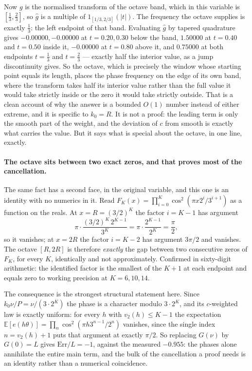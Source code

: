 \documentclass[11pt]{article}
\theoremstyle{remark}
\begin{document}
Now $g$ is the normalised transform of the octave band, which in this variable is $[\tfrac13,\tfrac23]$,
so $\hat g$ is a multiple of $1_{[1/3,2/3]}(|t|)$. The frequency the octave supplies is exactly
$\tfrac13$: the left endpoint of that band. Evaluating $\hat g$ by tapered quadrature gives
$-0.00000,-0.00000$ at $t=0.20,0.30$ below the band, $1.50000$ at $t=0.40$ and $t=0.50$ inside it,
$-0.00000$ at $t=0.80$ above it, and $0.75000$ at both endpoints $t=\tfrac13$ and $t=\tfrac23$ ---
exactly half the interior value, as a jump discontinuity gives. So the octave, which is precisely the
window whose starting point equals its length, places the phase frequency on the edge of its own band,
where the transform takes half its interior value rather than the full value it would take strictly
inside or the zero it would take strictly outside. That is a clean account of why the answer is a
bounded $O(1)$ number instead of either extreme, and it is specific to $k_0=R$. It is not a proof: the
leading term is only the smooth part of the weight, and the deviation of $c$ from smooth is exactly what
carries the value. But it says what is special about the octave, in one line, exactly.

\paragraph{The octave sits between two exact zeros, and that proves most of the cancellation.} The same
fact has a second face, in the original variable, and this one is an identity with no numerics in it.
Read $F_K(x)=\prod_{i=0}^K\cos^2(\pi x2^i/3^{i+1})$ as a function on the reals. At $x=R=(3/2)^K$ the
factor $i=K-1$ has argument
\[
  \pi\cdot\frac{(3/2)^K\,2^{K-1}}{3^K}=\pi\cdot\frac{2^{K-1}}{2^K}=\frac\pi2 ,
\]
so it vanishes; at $x=2R$ the factor $i=K-2$ has argument $3\pi/2$ and vanishes. The octave $[R,2R]$ is
therefore \emph{exactly} the gap between two consecutive zeros of $F_K$, for every $K$, identically and
not approximately. Confirmed in sixty-digit arithmetic: the identified factor is the smallest of the
$K+1$ at each endpoint and equals zero to working precision at $K=6,10,14$.

The consequence is the strongest structural statement here. Since $k_0\nu/P=\nu/(3\cdot2^K)$ the phase
is a character modulo $3\cdot2^K$, and its $c$-weighted law is exactly uniform: for every $h$ with
$v_2(h)\le K-1$ the expectation $\mathbb E[e(h\theta)]=\prod_n\cos^2(\pi h3^{n-1}/2^n)$ vanishes, since
the single index $n=v_2(h)+1$ puts that argument at exactly $\pi/2$. So replacing $G(\nu)$ by $G(0)=L$
gives $\mathrm{Err}/L=-1$, against the measured $-0.955$: the phases alone annihilate the entire main
term, and the bulk of the cancellation a proof needs is an identity rather than a numerical coincidence.
\end{document}
